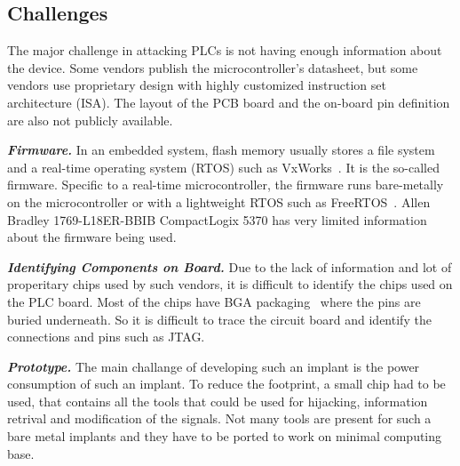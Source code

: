 \subsection{Challenges}

The major challenge in attacking PLCs is not having enough information about the device. Some vendors publish the microcontroller's datasheet, but some vendors use proprietary design with highly customized instruction set architecture (ISA).  The layout of the PCB board and the on-board pin definition are also not publicly available.


\textbf{\textit{Firmware.}} In an embedded system, flash memory usually stores a file system and a real-time operating system (RTOS) such as VxWorks~\cite{neugass1991vxworks}. It is the so-called firmware. Specific to a real-time microcontroller, the firmware runs bare-metally on the microcontroller or with a lightweight RTOS such as FreeRTOS~\cite{barry2008freertos}. Allen Bradley 1769-L18ER-BBIB CompactLogix 5370 has very limited information about the firmware being used. 

\textbf{\textit{Identifying Components on Board.}} Due to the lack of information and lot of properitary chips used by such vendors, it is difficult to identify the chips used on the PLC board. Most of the chips have BGA packaging~\cite{joshi2000mosfet} where the pins are buried underneath. So it is difficult to trace the circuit board and identify the connections and pins such as JTAG. 

\textbf{\textit{Prototype.}} The main challange of developing such an implant is the power consumption of such an implant. To reduce the footprint, a small chip had to be used, that contains all the tools that could be used for hijacking, information retrival and modification of the signals. Not many tools are present for such a bare metal implants and they have to be ported to work on minimal computing base.   
